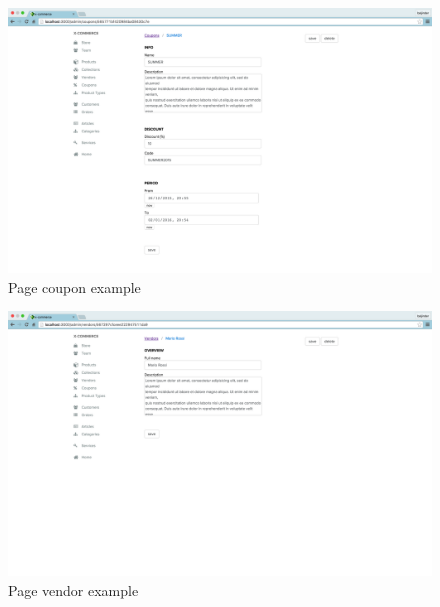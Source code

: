 \begin{figure}[htb]
\centering
\includegraphics[width=1.0\linewidth]{images/chapter3/page-coupon-all.png}\hfill
\caption[page coupon example]{Page coupon example}
\label{fig:design_page}
\end{figure}
\begin{figure}[htb]
\centering
\includegraphics[width=1.0\linewidth]{images/chapter3/page-vendor-all.png}\hfill
\caption[page vendor example]{Page vendor example}
\label{fig:design_page}
\end{figure}